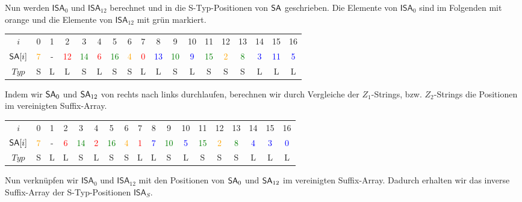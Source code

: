 Nun werden $\mathsf{ISA}_0$ und $\mathsf{ISA}_{12}$ berechnet und in die S-Typ-Positionen von $\sa$ geschrieben. Die Elemente von $\mathsf{ISA}_0$ sind im Folgenden mit orange und die Elemente von $\mathsf{ISA}_{12}$ mit grün markiert.

\begin{table}[H]
	\footnotesize
	\centering
	\begin{tabular}{c| c c c c c c c c c c c c c c c c c}
		$i$ & 0 & 1 & 2 & 3 & 4 & 5 & 6 & 7 & 8 & 9 & 10 & 11 & 12 & 13 & 14 & 15 & 16 \\
		$\sa[i]$ & \textcolor{orange}{7} & - & \textcolor{red}{12} & \textcolor{green}{14} & \textcolor{red}{6} & \textcolor{green}{16} & \textcolor{orange}{4} & \textcolor{red}{0} & \textcolor{blue}{13} & \textcolor{green}{10} & \textcolor{blue}{9} & \textcolor{green}{15} & \textcolor{orange}{2} & \textcolor{green}{8} & \textcolor{blue}{3} & \textcolor{blue}{11} & \textcolor{blue}{5} \\
		$Typ$ & S & L & L & S & L & S & S & L & L & S & L & S & S & S & L & L & L
	\end{tabular}
\end{table}

Indem wir $\sa_0$ und $\sa_{12}$ von rechts nach links durchlaufen, berechnen wir durch Vergleiche der $Z_1$-Strings, bzw. $Z_2$-Strings die Positionen im vereinigten Suffix-Array. 

\begin{table}[H]
	\footnotesize
	\centering
	\begin{tabular}{c| c c c c c c c c c c c c c c c c c}
		$i$ & 0 & 1 & 2 & 3 & 4 & 5 & 6 & 7 & 8 & 9 & 10 & 11 & 12 & 13 & 14 & 15 & 16 \\
		$\sa[i]$ & \textcolor{orange}{7} & - & \textcolor{red}{6} & \textcolor{green}{14} & \textcolor{red}{2} & \textcolor{green}{16} & \textcolor{orange}{4} & \textcolor{red}{1} & \textcolor{blue}{7} & \textcolor{green}{10} & \textcolor{blue}{5} & \textcolor{green}{15} & \textcolor{orange}{2} & \textcolor{green}{8} & \textcolor{blue}{4} & \textcolor{blue}{3} & \textcolor{blue}{0} \\
		$Typ$ & S & L & L & S & L & S & S & L & L & S & L & S & S & S & L & L & L
	\end{tabular}
\end{table}

Nun verknüpfen wir $\mathsf{ISA}_0$ und $\mathsf{ISA}_{12}$ mit den Positionen von $\sa_0$ und $\sa_{12}$ im vereinigten Suffix-Array. Dadurch erhalten wir das inverse Suffix-Array der S-Typ-Positionen $\mathsf{ISA}_S$.

